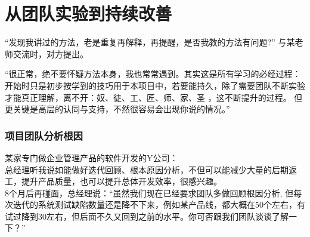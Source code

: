 \chapter{从团队实验到持续改善} %



``发现我讲过的方法，老是重复再解释，再提醒，是否我教的方法有问题?''
与某老师交流时，对方提出。

``很正常，绝不要怀疑方法本身，我也常常遇到。其实这是所有学习的必经过程：开始时只是初步按学到的技巧用于本项目中，若要能持久，除了需要团队不断实验才能真正理解，离不开：奴、徒、工、匠、师、家、圣
，这不断提升的过程。
但更关键是高层的认同与支持，不然很容易会出现你说的情况。''

\hypertarget{ux9879ux76eeux56e2ux961fux5206ux6790ux6839ux56e0}{%
\subsection{项目团队分析根因}\label{ux9879ux76eeux56e2ux961fux5206ux6790ux6839ux56e0}}

某家专门做企业管理产品的软件开发的Y公司：\\
总经理听我说如能做好迭代回顾、根本原因分析，不但可以能减少大量的后期返工，提升产品质量，也可以提升总体开发效率，很感兴趣。\\
8个月后再碰面，总经理说：``虽然我们现在已经要求团队多做回顾根因分析,
但每次迭代的系统测试缺陷数量还是降不下来，例如某产品线，都大概在50个左右，有试过降到30左右，但后面不久又回到之前的水平。你可否跟我们团队谈谈了解一下？''




